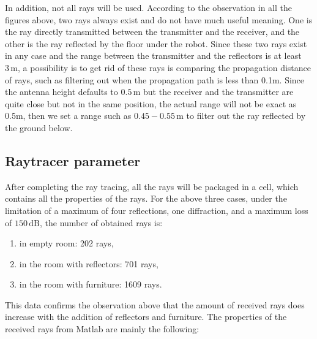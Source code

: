 \documentclass[12pt,DIV14,BCOR12mm,a4paper,footinclude=false,headinclude,parskip=half-,twoside,openright,cleardoublepage=empty,toc=index,bibliography=totoc,listof=totoc]{scrreprt}
\numberwithin{equation}{chapter}
\begin{document}
In addition, not all rays will be used. According to the observation in all the figures above, two rays always exist and do not have much useful meaning. One is the ray directly transmitted between the transmitter and the receiver, and the other is the ray reflected by the floor under the robot. Since these two rays exist in any case and the range between the transmitter and the reflectors is at least $3\,\mathrm{m}$, a possibility is to get rid of these rays is comparing the propagation distance of rays, such as filtering out when the propagation path is less than 0.1m. Since the antenna height defaults to $0.5\,\mathrm{m}$ but the receiver and the transmitter are quite close but not in the same position, the actual range will not be exact as 0.5m, then we set a range such as $0.45-0.55\,\mathrm{m}$ to filter out the ray reflected by the ground below.

\subsection{Raytracer parameter} \label{Raytracer parameter}
After completing the ray tracing, all the rays will be packaged in a cell, which contains all the properties of the rays. For the above three cases, under the limitation of a maximum of four reflections, one diffraction, and a maximum loss of $150\,\mathrm{dB}$, the number of obtained rays is:

\begin{enumerate}[label=\textbullet]
    \item in empty room: 202 rays,
    \item in the room with reflectors: 701 rays,
    \item in the room with furniture: 1609 rays.
\end{enumerate}

This data confirms the observation above that the amount of received rays does increase with the addition of reflectors and furniture. The properties of the received rays from Matlab \cite{rays_properties} are mainly the following:
\end{document}
